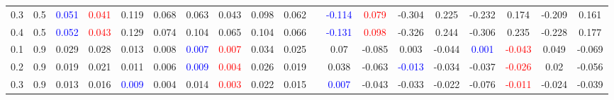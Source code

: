 \documentclass[specialist,
substylefile = spbu_report.rtx,
subf,href,colorlinks=true, 12pt]{disser}
\theoremstyle{definition}
\begin{document}
\begin{table}
{\begin{tabular}{m{1cm}m{1cm}ccccccccm{0.5cm}cccccccc}
			0.3 & 0.5    & \textcolor{blue}{0.051}                 & \textcolor{red}{0.041}                     & 0.119                               & 0.068                       & 0.063                   & 0.043                                   & 0.098                                      & 0.062                    &                             & \textcolor{blue}{-0.114} & \textcolor{red}{0.079} & -0.304                   & 0.225      & -0.232                   & 0.174                   & -0.209                   & 0.161                  \\
			0.4 & 0.5    & \textcolor{blue}{0.052}                 & \textcolor{red}{0.043}                     & 0.129                               & 0.074                       & 0.104                   & 0.065                                   & 0.104                                      & 0.066                    &                             & \textcolor{blue}{-0.131} & \textcolor{red}{0.098} & -0.326                   & 0.244      & -0.306                   & 0.235                   & -0.228                   & 0.177                  \\
			\hline
			0.1 & 0.9    & 0.029                                   & 0.028                                      & 0.013                               & 0.008                       & \textcolor{blue}{0.007} & \textcolor{red}{0.007}                  & 0.034                                      & 0.025                    &                             & 0.07                     & -0.085                 & 0.003                    & -0.044     & \textcolor{blue}{0.001}  & \textcolor{red}{-0.043} & 0.049                    & -0.069                 \\
			0.2 & 0.9    & 0.019                                   & 0.021                                      & 0.011                               & 0.006                       & \textcolor{blue}{0.009} & \textcolor{red}{0.004}                  & 0.026                                      & 0.019                    &                             & 0.038                    & -0.063                 & \textcolor{blue}{-0.013} & -0.034     & -0.037                   & \textcolor{red}{-0.026} & 0.02                     & -0.056                 \\
			0.3 & 0.9    & 0.013                                   & 0.016                                      & \textcolor{blue}{0.009}             & 0.004                       & 0.014                   & \textcolor{red}{0.003}                  & 0.022                                      & 0.015                    &                             & \textcolor{blue}{0.007}  & -0.043                 & -0.033                   & -0.022     & -0.076                   & \textcolor{red}{-0.011} & -0.024                   & -0.039                 \\

\end{tabular}}
\end{table}
\end{document}
